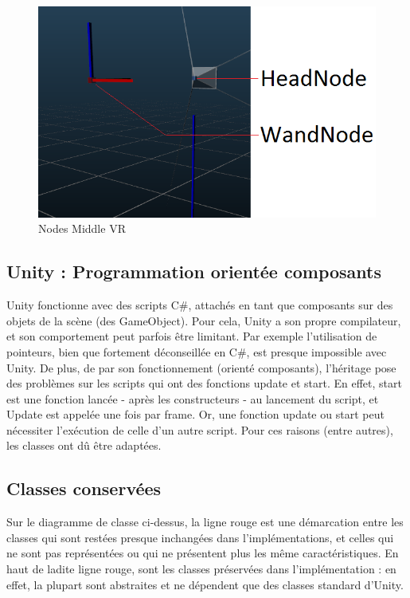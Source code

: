 \begin{figure}[h]
	\centering
		\includegraphics[width=\linewidth]{7-RapportFinal/img/middleVR.PNG}
		\caption{Nodes Middle VR}
		\label{middleVR}
	
\end{figure}

\subsection{Unity : Programmation orientée composants}

Unity fonctionne avec des scripts C\#, attachés en tant que composants sur des objets de la scène (des GameObject).
Pour cela, Unity a son propre compilateur, et son comportement peut parfois être limitant.
Par exemple l'utilisation de pointeurs, bien que fortement déconseillée en C\#, est presque impossible avec Unity. De plus, de par son fonctionnement (orienté composants), l'héritage pose des problèmes sur les scripts qui ont des fonctions update et start.
En effet, start est une fonction lancée - après les constructeurs - au lancement du script, et Update est appelée une fois par frame.
Or, une fonction update ou start peut nécessiter l'exécution de celle d'un autre script. Pour ces raisons (entre autres), les classes ont dû être adaptées.

\subsection{Classes conservées}

Sur le diagramme de classe ci-dessus, la ligne rouge est une démarcation entre les classes qui sont restées
presque inchangées dans l'implémentations, et celles qui ne sont pas représentées ou qui ne présentent plus
les même caractéristiques. En haut de ladite ligne rouge, sont les classes préservées dans
l'implémentation : en effet, la plupart sont abstraites et ne dépendent que des classes standard d'Unity.

